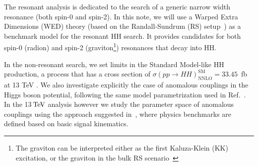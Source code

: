 The resonant analysis is dedicated to the search of a generic narrow width resonance (both spin-0 and spin-2).
In this note, we will use a Warped Extra Dimensions (WED) theory (based on the Randall-Sundrum (RS) setup~\cite{Randall:1999ee}) as a benchmark model for the resonant HH search. It provides candidates for both spin-0 (radion) and spin-2 (graviton\footnote{The graviton can be interpreted either as the first Kaluza-Klein (KK) excitation, or the graviton in the bulk RS scenario~\cite{Davoudiasl:2000wi,Csaki:2000zn, Agashe:2007zd} }) resonances that decay into HH. 


In the non-resonant search, we set limits in the Standard Model-like HH production, a process that has a cross section of $\sigma(pp\rightarrow HH)^{\text{SM}}_{\text{NNLO}} = 33.45$~fb~ at 13 TeV \cite{MelladoGarcia:2150771}.
We also investigate explicitly the case of anomalous couplings in the Higgs boson potential, 
following the same model parametrization used in Ref.~\cite{HIG-13-032}.  
In the 13$\,\text{Te\hspace{-.08em}V}$ analysis however we study the parameter space of anomalous couplings 
using the approach suggested in~\cite{Dall'Osso:2015aia}, where physics benchmarks are defined based on basic signal kinematics. 


